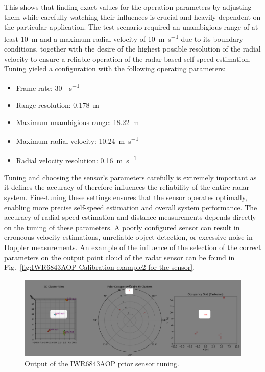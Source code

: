 This shows that finding exact values for the operation parameters by adjusting them while carefully watching their influences is crucial and heavily dependent on the particular application.
The test scenario required an unambigious range of at least \SI{10}{\meter} and a maximum radial velocity of \SI{10}{\meter\per\second} due to its boundary conditions, together with the desire of the highest possible resolution of the radial velocity to ensure a reliable operation of the radar-based self-speed estimation.
Tuning yieled a configuration with the following operating parameters:
\begin{itemize}
    \item Frame rate: \SI{30}{\frame\per\second}
    \item Range resolution: \SI{0.178}{\meter}
    \item Maximum unambigious range: \SI{18.22}{\meter}
    \item Maximum radial velocity: \SI{10.24}{\meter\per\second}
    \item Radial velocity resolution: \SI{0.16}{\meter\per\second}
\end{itemize}

Tuning and choosing the sensor's parameters carefully is extremely important as it defines the accuracy of 
therefore influences the reliability of the entire radar system.
Fine-tuning these settings ensures that the sensor operates optimally, enabling more precise self-speed estimation and overall system performance.
The accuracy of radial speed estimation and distance measurements depends directly on the tuning of these parameters. A poorly configured sensor can result in erroneous velocity estimations, unreliable object detection, or excessive noise in Doppler measurements. An example of the influence of the selection of the correct parameters on the output point cloud of the radar sensor can be found in Fig.~\ref{fig:IWR6843AOP Calibration example2 for the sensor}.

\begin{figure}[!htbp]
    \centering
    \includegraphics[width=1.0\linewidth]{images/calib_ex.png}
    \caption{Output of the IWR6843AOP prior sensor tuning.}
    \label{fig:IWR6843AOP Calibration example for the sensor}
\end{figure}

